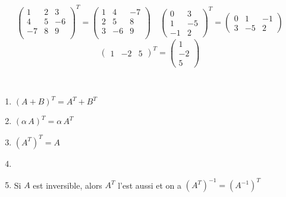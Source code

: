 \begin{frame}
\begin{exemple}
\[
\left( \begin{smallmatrix}
1&2&3\\
4&5&-6\\
-7&8&9\\
\end{smallmatrix}\right)^T
= 
\left( \begin{smallmatrix}
1&4&-7\\
2&5&8\\
3&-6&9\\
\end{smallmatrix}\right)
\quad
\left( \begin{smallmatrix}
 0 & 3\\
 1 & -5\\
 -1 & 2  
\end{smallmatrix}\right)^T=
\left( \begin{smallmatrix}
 0 & 1 & -1\\
 3 &-5 & 2  
\end{smallmatrix}\right)
\]\[
\left( \begin{smallmatrix}
1 & -2 & 5 \end{smallmatrix}\right)^T  = 
\left( \begin{smallmatrix}
 1 \\
 -2\\
 5   
\end{smallmatrix}\right)
\]
\end{exemple} 
\pause %
\begin{theoreme}~
 \begin{enumerate}
    \item $(A + B)^T = A^T + B^T$
    \pause %
    \item $(\alpha \, A)^T = \alpha \, A^T $
    \pause %
    \item $(A^T)^T = A$
    \pause %
    \item {} %
    \pause %
    \item Si $A$ est inversible, alors $A^T$ l'est aussi et on a $(A^T)^{-1}=(A^{-1})^T$
  \end{enumerate} 
\label{theotranspo}
\end{theoreme}
\end{frame}


